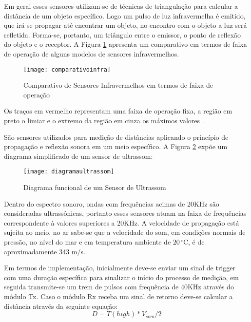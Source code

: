 				Em geral esses sensores utilizam-se de técnicas de triangulação para calcular a distância de um objeto específico. Logo um pulso de luz infravermelha é emitido, que irá se propagar até encontrar um objeto, no encontro com o objeto a luz será refletida. Forma-se, portanto, um triângulo entre o emissor, o ponto de reflexão do objeto e o receptor. A Figura \ref{sensorinfra}  apresenta um comparativo em termos de faixa de operação de alguns modelos de sensores infravermelhos.
			
			\newpage
			\begin{figure}[!h]
				\centering
				\texttt{[image: comparativoinfra]}
				\caption{Comparativo de Sensores Infravermelhos em termos de faixa de operação}
				\label{sensorinfra}
			\end{figure}

				Os traços em vermelho representam uma faixa de operação fixa, a região em preto o limiar e o extremo da região em cinza os máximos valores .



			São sensores utilizados para medição de distâncias aplicando o princípio de propagação e reflexão sonora em um meio específico. A Figura \ref{diagramaultrassom} expõe um diagrama simplificado de um sensor de ultrassom:

			\begin{figure}[!h]
				\centering
				\texttt{[image: diagramaultrassom]}
				\caption{Diagrama funcional de um Sensor de Ultrassom}
				\label{diagramaultrassom}
			\end{figure}

				Dentro do espectro sonoro, ondas com frequências acimas de 20KHz são consideradas ultrassônicas, portanto esses sensores atuam na faixa de frequências correspondente à valores superiores a 20KHz. A velocidade de propagação está sujeita ao meio, no ar sabe-se que a velocidade do som, em condições normais de pressão, no nível do mar e em temperatura ambiente de $20\,^{\circ}\mathrm{C}$, é de aproximadamente 343 m/s. 
				
				Em termos de implementação, inicialmente deve-se enviar um sinal de trigger com uma duração específica para sinalizar o início do processo de medição, em seguida transmite-se um trem de pulsos com frequência de 40KHz através do módulo Tx. Caso o módulo Rx receba um sinal de retorno deve-se calcular a distância através da seguinte equação:
				$$ D = T(high)*V_{som}/2 $$
				
